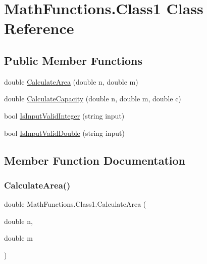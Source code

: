 \hypertarget{class_math_functions_1_1_class1}{}\section{Math\+Functions.\+Class1 Class Reference}
\label{class_math_functions_1_1_class1}
\subsection*{Public Member Functions}
\begin{DoxyCompactItemize}
\item 
double \hyperlink{class_math_functions_1_1_class1_a23b54adf56c85228348f617785972ca6}{Calculate\+Area} (double n, double m)
\item 
double \hyperlink{class_math_functions_1_1_class1_ab06bda13723f600d4da441bbda5a313e}{Calculate\+Capacity} (double n, double m, double c)
\item 
bool \hyperlink{class_math_functions_1_1_class1_ab8c871446d8a8266122a1e393a902483}{Is\+Input\+Valid\+Integer} (string input)
\item 
bool \hyperlink{class_math_functions_1_1_class1_a9b1e35acf62251de45602651e9fa956f}{Is\+Input\+Valid\+Double} (string input)
\end{DoxyCompactItemize}


\subsection{Member Function Documentation}
\mbox{\label{class_math_functions_1_1_class1_a23b54adf56c85228348f617785972ca6}} 
\subsubsection{\texorpdfstring{Calculate\+Area()}{CalculateArea()}}
{\footnotesize\ttfamily double Math\+Functions.\+Class1.\+Calculate\+Area (\begin{DoxyParamCaption}\item[{double}]{n,  }\item[{double}]{m }\end{DoxyParamCaption})}

